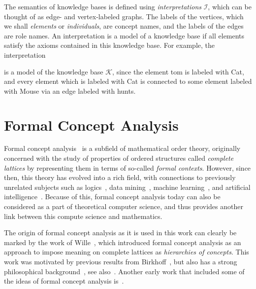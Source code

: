 The semantics of knowledge bases is defined using \emph{interpretations} $\mathcal{I}$,
which can be thought of as edge- and vertex-labeled graphs.  The labels of the vertices,
which we shall \emph{elements} or \emph{individuals}, are concept names, and the labels of
the edges are role names.  An interpretation is a model of a knowledge base if all
elements satisfy the axioms contained in this knowledge base.  For example, the
interpretation
\begin{center}
\end{center}
is a model of the knowledge base $\mathcal{K}$, since the element \textsf{tom} is labeled
with \textsf{Cat}, and every element which is labeled with \textsf{Cat} is connected to
some element labeled with \textsf{Mouse} via an edge labeled with \textsf{hunts}.

\section{Formal Concept Analysis}
\label{sec:learn-impl-using}

Formal concept analysis~\cite{fca-book} is a subfield of mathematical order theory,
originally concerned with the study of properties of ordered structures called
\emph{complete lattices} by representing them in terms of so-called \emph{formal
  contexts}.  However, since then, this theory has evolved into a rich field, with
connections to previously unrelated subjects such as
logics~\cite{books/math/Prediger00,conf/iccs/FerreR00}, data
mining~\cite{arules:Zaki:1998}, machine learning~\cite{conf/icfca/Kuznetsov04}, and
artificial intelligence~\cite{rudolph2006relational,Diss-Felix}.  Because of this, formal
concept analysis today can also be considered as a part of theoretical computer science,
and thus provides another link between this compute science and mathematics.

The origin of formal concept analysis as it is used in this work can clearly be marked by
the work of Wille~\cite{fca:Wille:1982}, which introduced formal concept analysis as an
approach to impose meaning on complete lattices as \emph{hierarchies of concepts}.  This
work was motivated by previous results from Birkhoff~\cite{books/math/Birkhoff67}, but
also has a strong philosophical background~\cite{books/phil/Hentig72}, see
also~\cite{Wille:Begriffsdenken}.  Another early work that included some of the ideas of
formal concept analysis is~\cite{OrdreEtClassification}.

